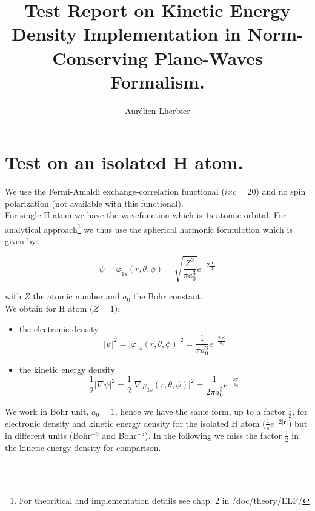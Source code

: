 \documentclass[a4paper,12pt]{report}
\title{Test Report on Kinetic Energy Density Implementation in Norm-Conserving Plane-Waves Formalism.}
\author{Aur\'{e}lien Lherbier}
\begin{document}
\maketitle

\chapter{Test on an isolated H atom.}
\label{chapter1}

We use the Fermi-Amaldi exchange-correlation functional ($ixc=20$) and no spin polarization (not available with this functional).\\
For single H atom we have the wavefunction which is $1s$ atomic orbital.
For analytical approach\footnote{For theoritical and implementation details see chap. $2$ in /doc/theory/ELF/} we thus use the spherical harmonic formulation which is given by:

\begin{equation}
\psi = \varphi_{1s}(r,\theta,\phi) = \sqrt{\frac{Z^3}{\pi a_0^3}} e^{-Z \frac{\vert \mathbf{r} \vert}{a_0}}
\end{equation}

with $Z$ the atomic number and $a_0$ the Bohr constant.\\
We obtain for H atom ($Z=1$):\\

\begin{itemize}
\item the electronic density
\begin{equation}
\vert \psi \vert^2 = \vert \varphi_{1s}(r,\theta,\phi) \vert^2 = \frac{1}{\pi a_0^3} e^{-\frac{2\vert \mathbf{r} \vert}{a_0}}
\end{equation}
\item the kinetic energy density
\begin{equation}
\frac{1}{2} \vert \nabla \psi \vert^2 = \frac{1}{2} \vert \nabla \varphi_{1s}(r,\theta,\phi) \vert^2 = \frac{1}{2\pi a_0^5} e^{-\frac{2\vert \mathbf{r} \vert}{a_0}}
\end{equation}
\end{itemize}

We work in Bohr unit, $a_0=1$, hence we have the same form, up to a factor $\frac{1}{2}$, for electronic density and kinetic energy density for the isolated H atom ($\frac{1}{\pi} e^{-2\vert \mathbf{r} \vert}$) but in different units (Bohr$^{-3}$ and Bohr$^{-5}$). In the following we miss the factor $\frac{1}{2}$ in the kinetic energy density for comparison.\\\\\\
\end{document}
